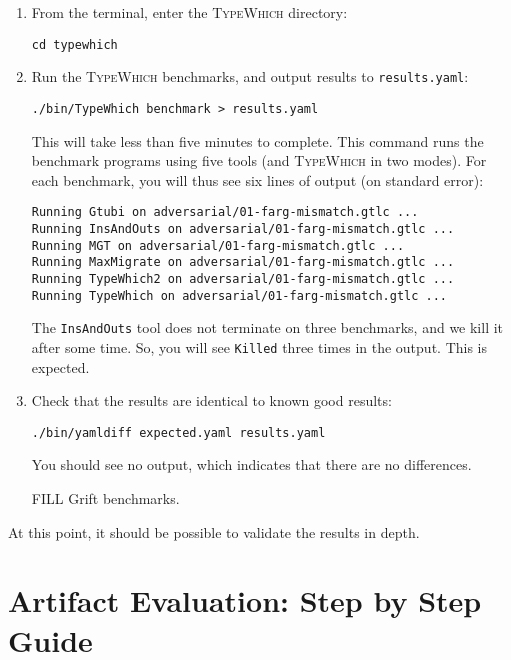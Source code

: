 \documentclass{book}
\newcommand{\system}{\textsc{TypeWhich}\xspace}
\begin{document}
\begin{enumerate}
     
\item From the terminal, enter the \system directory:

\begin{verbatim}
cd typewhich
\end{verbatim}

\item Run the \system benchmarks, and output results to \texttt{results.yaml}:

\begin{verbatim}
./bin/TypeWhich benchmark > results.yaml
\end{verbatim}

This will take less than five minutes to complete. This command runs the
benchmark programs using five tools (and \system in two modes). For each
benchmark, you will thus see six lines of output (on standard error):
\begin{verbatim}
Running Gtubi on adversarial/01-farg-mismatch.gtlc ...
Running InsAndOuts on adversarial/01-farg-mismatch.gtlc ...
Running MGT on adversarial/01-farg-mismatch.gtlc ...
Running MaxMigrate on adversarial/01-farg-mismatch.gtlc ...
Running TypeWhich2 on adversarial/01-farg-mismatch.gtlc ...
Running TypeWhich on adversarial/01-farg-mismatch.gtlc ...
\end{verbatim}

The \texttt{InsAndOuts} tool does not terminate on three benchmarks, and
we kill it after some time. So, you will see \texttt{Killed} three times
in the output. This is expected.

\item Check that the results are identical to known good results:

\begin{verbatim}
./bin/yamldiff expected.yaml results.yaml
\end{verbatim}

You should see no output, which indicates that there are no differences.

\item [FILL] Grift benchmarks.

\end{enumerate}

At this point, it should be possible to validate the results in depth.

\chapter{Artifact Evaluation: Step by Step Guide}
\end{document}
